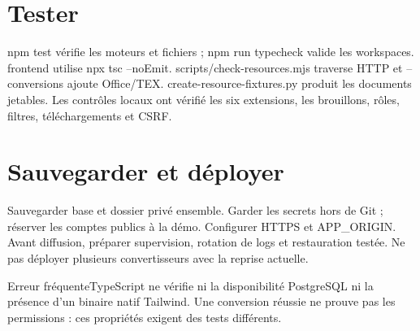 \section{Tester}
npm test vérifie les moteurs et fichiers ; npm run typecheck valide les workspaces. frontend utilise npx tsc --noEmit. scripts/check-resources.mjs traverse HTTP et --conversions ajoute Office/TEX. create-resource-fixtures.py produit les documents jetables. Les contrôles locaux ont vérifié les six extensions, les brouillons, rôles, filtres, téléchargements et CSRF.

\section{Sauvegarder et déployer}
Sauvegarder base et dossier privé ensemble. Garder les secrets hors de Git ; réserver les comptes publics à la démo. Configurer HTTPS et APP\_ORIGIN. Avant diffusion, préparer supervision, rotation de logs et restauration testée. Ne pas déployer plusieurs convertisseurs avec la reprise actuelle.

\begin{concept}{Erreur fréquente}TypeScript ne vérifie ni la disponibilité PostgreSQL ni la présence d’un binaire natif Tailwind. Une conversion réussie ne prouve pas les permissions : ces propriétés exigent des tests différents.\end{concept}
